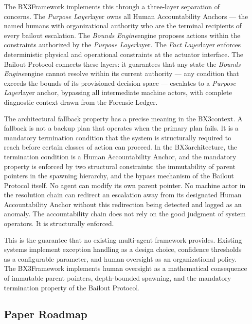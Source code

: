 \documentclass[12pt]{article}
\newcommand{\bxthree}{\mbox{BX3}}
\newcommand{\purpose}{\textit{Purpose Layer}}
\newcommand{\bounds}{\textit{Bounds Engine}}
\newcommand{\fact}{\textit{Fact Layer}}
\begin{document}
The \bxthree Framework implements this through a three-layer separation of concerns. The \purpose layer owns all Human Accountability Anchors — the named humans with organizational authority who are the terminal recipients of every bailout escalation. The \bounds engine proposes actions within the constraints authorized by the \purpose layer. The \fact layer enforces deterministic physical and operational constraints at the actuator interface. The Bailout Protocol connects these layers: it guarantees that any state the \bounds engine cannot resolve within its current authority — any condition that exceeds the bounds of its provisioned decision space — escalates to a \purpose layer anchor, bypassing all intermediate machine actors, with complete diagnostic context drawn from the Forensic Ledger.

The architectural fallback property has a precise meaning in the \bxthree context. A fallback is not a backup plan that operates when the primary plan fails. It is a mandatory termination condition that the system is structurally required to reach before certain classes of action can proceed. In the \bxthree architecture, the termination condition is a Human Accountability Anchor, and the mandatory property is enforced by two structural constraints: the immutability of parent pointers in the spawning hierarchy, and the bypass mechanism of the Bailout Protocol itself. No agent can modify its own parent pointer. No machine actor in the resolution chain can redirect an escalation away from its designated Human Accountability Anchor without this redirection being detected and logged as an anomaly. The accountability chain does not rely on the good judgment of system operators. It is structurally enforced.

This is the guarantee that no existing multi-agent framework provides. Existing systems implement exception handling as a design choice, confidence thresholds as a configurable parameter, and human oversight as an organizational policy. The \bxthree Framework implements human oversight as a mathematical consequence of immutable parent pointers, depth-bounded spawning, and the mandatory termination property of the Bailout Protocol.

\subsection{Paper Roadmap}
\end{document}
